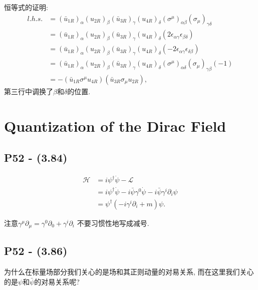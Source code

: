 恒等式的证明:
\begin{equation}
  \begin{aligned}
    l.h.s. & = (\bar{u}_{1R})_\alpha (u_{2R})_\beta (\bar{u}_{3R})_\gamma (u_{4R})_\delta (\sigma^{\mu})_{\alpha\beta} (\sigma_{\mu})_{\gamma\delta}      \\
           & = (\bar{u}_{1R})_\alpha (u_{2R})_\beta (\bar{u}_{3R})_\gamma (u_{4R})_\delta (2\epsilon_{\alpha\gamma} \epsilon_{\beta\delta})               \\
           & = (\bar{u}_{1R})_\alpha (u_{2R})_\beta (\bar{u}_{3R})_\gamma (u_{4R})_\delta (-2\epsilon_{\alpha\gamma} \epsilon_{\delta\beta})              \\
           & = (\bar{u}_{1R})_\alpha (u_{2R})_\beta (\bar{u}_{3R})_\gamma (u_{4R})_\delta (\sigma^{\mu})_{\alpha\delta} (\sigma_{\mu})_{\gamma\beta} (-1) \\
           & = -(\bar{u}_{1R} \sigma^{\mu} u_{4R})(\bar{u}_{3R} \sigma_{\mu} u_{2R}),
  \end{aligned}
\end{equation}
第三行中调换了$\beta$和$\delta$的位置.

\section{Quantization of the Dirac Field}

\subsection{{P52} - (3.84)}
\begin{equation}
  \begin{aligned}
    \mathcal{H} & = i {\psi}^\dagger \dot{\psi} - \mathcal{L}                                                              \\
                & = i {\psi}^\dagger \dot{\psi} - i \bar{\psi} \gamma^0 \dot{\psi} - i \bar{\psi} \gamma^i \partial_i \psi \\
                & = {\psi}^\dagger (-i \gamma^i \partial_i + m) \psi.
  \end{aligned}
\end{equation}

\begin{mybox}{}
  注意$\gamma^\mu \partial_\mu = \gamma^0 \partial_0 + \gamma^i \partial_i$
  不要习惯性地写成减号.
\end{mybox}

\subsection{P52 - (3.86)}
为什么在标量场部分我们关心的是场和其正则动量的对易关系, 而在这里我们关心的是$\psi$和$\bar{\psi}$的对易关系呢?

